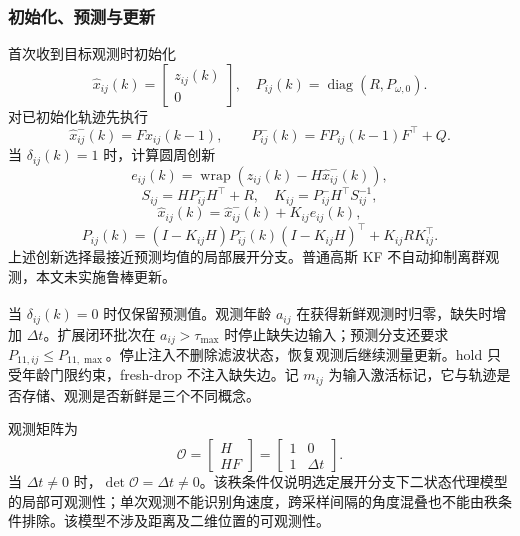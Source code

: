 \documentclass[UTF8,fontset=windows,11pt]{ctexart}
\newcommand{\upcite}[1]{\textsuperscript{\cite{#1}}}
\begin{document}
\subsubsection{初始化、预测与更新}
首次收到目标观测时初始化
\begin{equation}
 \hat x_{ij}(k)=\begin{bmatrix}z_{ij}(k)\\0\end{bmatrix},
 \quad P_{ij}(k)=\operatorname{diag}(R,P_{\omega,0}).
\end{equation}
对已初始化轨迹先执行
\begin{equation}
 \hat x^-_{ij}(k)=F\hat x_{ij}(k-1),\qquad
 P^-_{ij}(k)=FP_{ij}(k-1)F^\top+Q.
\end{equation}
当 $\delta_{ij}(k)=1$ 时，计算圆周创新
\begin{equation}
 e_{ij}(k)=\operatorname{wrap}\left(z_{ij}(k)-H\hat x^-_{ij}(k)\right),
\end{equation}
\begin{equation}
 S_{ij}=HP^-_{ij}H^\top+R,\quad K_{ij}=P^-_{ij}H^\top S_{ij}^{-1},
\end{equation}
\begin{equation}
 \hat x_{ij}(k)=\hat x^-_{ij}(k)+K_{ij}e_{ij}(k),
\end{equation}
\begin{equation}
 P_{ij}(k)=(I-K_{ij}H)P^-_{ij}(k)(I-K_{ij}H)^\top+K_{ij}RK_{ij}^\top.
\end{equation}
上述创新选择最接近预测均值的局部展开分支。普通高斯 KF 不自动抑制离群观测，本文未实施鲁棒更新。

当 $\delta_{ij}(k)=0$ 时仅保留预测值\upcite{Sinopoli2004}。观测年龄 $a_{ij}$ 在获得新鲜观测时归零，缺失时增加 $\Delta t$。扩展闭环批次在 $a_{ij}>\tau_{\max}$ 时停止缺失边输入；预测分支还要求 $P_{11,ij}\le P_{11,\max}$。停止注入不删除滤波状态，恢复观测后继续测量更新。hold 只受年龄门限约束，fresh-drop 不注入缺失边。记 $m_{ij}$ 为输入激活标记，它与轨迹是否存储、观测是否新鲜是三个不同概念。

观测矩阵为
\begin{equation}
 \mathcal O=\begin{bmatrix}H\\HF\end{bmatrix}=\begin{bmatrix}1&0\\1&\Delta t\end{bmatrix}.
\end{equation}
当 $\Delta t\ne0$ 时，$\det\mathcal O=\Delta t\ne0$。该秩条件仅说明选定展开分支下二状态代理模型的局部可观测性；单次观测不能识别角速度，跨采样间隔的角度混叠也不能由秩条件排除。该模型不涉及距离及二维位置的可观测性。
\end{document}
